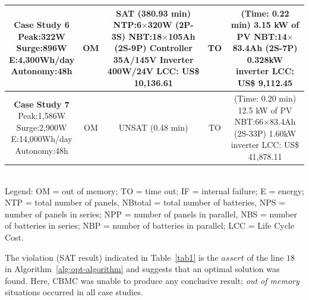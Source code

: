 \documentclass[runningheads]{llncs}
\begin{document}
\begin{table}
\begin{scriptsize}
\begin{tabular}{c|c|c|c|c}
\hline
\makecell{\textbf{Case Study 6}\\Peak:322W\\Surge:896W\\E:4,300Wh/day\\Autonomy:48h} & OM & \makecell {SAT (380.93 min) \\NTP:6$\times$320W (2P-3S)\\NBT:18$\times$105Ah (2S-9P)\\Controller 35A/145V\\Inverter 400W/24V \\LCC: US\$ 10,136.61} & TO & \makecell{(Time: 0.22 min)\\3.15 kW of PV\\NBT:14$\times$83.4Ah (2S-7P)\\0.328kW inverter\\LCC: US\$ 9,112.45} \\
\hline
\makecell{\textbf{Case Study 7}\\Peak:1,586W\\Surge:2,900W\\E:14,000Wh/day\\Autonomy:48h} & OM & UNSAT (0.48 min) & TO & \makecell{(Time: 0.20 min)\\12.5 kW of PV\\NBT:66$\times$83.4Ah (2S-33P)\\1.60kW inverter\\LCC: US\$ 41,878.11} \\
\hline
\hline
\end{tabular}
\\Legend: OM = out of memory; TO = time out; IF = internal failure; E = energy; NTP = total number of panels, NBtotal = total number of batteries, NPS = number of panels in series; NPP = number of panels in parallel, NBS = number of batteries in series; NBP = number of batteries in parallel; LCC = Life Cycle Cost.
\end{scriptsize}
\end{table}
%
The violation (SAT result) indicated in Table~\ref{tab1} is the $assert$ of the line $18$ in Algorithm~\ref{alg:opt-algorithm} and suggests that an optimal solution was found.
Here, CBMC was unable to produce any conclusive result; \textit{out of memory} situations occurred in all case studies.
\end{document}
